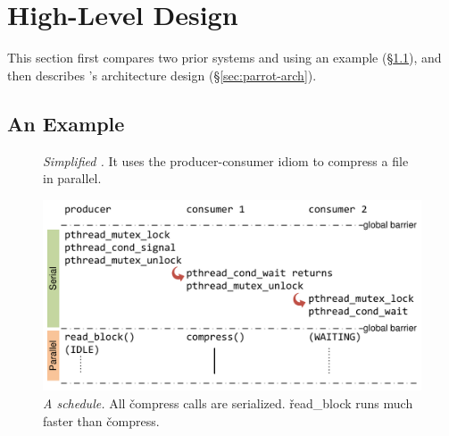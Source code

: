 \section{High-Level Design} \label{sec:parrot-design}

This section first compares two prior systems and \parrot using
an example (\S\ref{sec:parrot-example}), and then describes \parrot's architecture design
(\S\ref{sec:parrot-arch}).

\subsection{An Example} \label{sec:parrot-example}

\begin{figure}[!ht]
\vspace{-.1in}
\centering
\begin{minipage}{.5\linewidth}
\tiny {}
\end{minipage}
\vspace{-.1in}
\caption{{\em Simplified \pbzip.} It uses the producer-consumer idiom to
  compress a file in parallel.} \label{fig:parrot-example}
\vspace{-.05in}
\end{figure}

\begin{figure}[t]
\centering
\includegraphics[width=0.6\columnwidth]{parrot/figures/dthreads_schedule}
\vspace{-.2in}
\caption{{\em A \dthreads schedule.}  All
  \v{compress} calls are serialized. \v{read\_block} runs much faster than
  \v{compress}.}\label{fig:parrot-dthreads-schedule}
\vspace{-.05in}
\end{figure}

